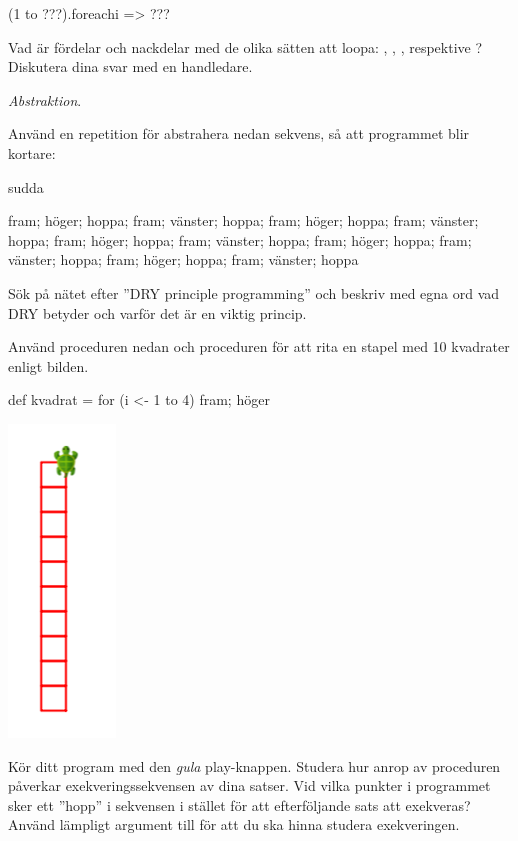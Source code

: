 \begin{Code}
(1 to ???).foreach{i => ???}
\end{Code} 


\Subtask\Checkpoint Vad är fördelar och nackdelar med de olika sätten att loopa: , , , respektive ? \Pen Diskutera dina svar med en handledare.

\Task \textit{Abstraktion}. 

\Subtask Använd en repetition för abstrahera nedan sekvens, så att programmet blir kortare:
\begin{Code}
sudda

fram; höger; hoppa; fram; vänster; hoppa; fram; höger; 
hoppa; fram; vänster; hoppa; fram; höger; hoppa; fram; 
vänster; hoppa; fram; höger; hoppa; fram; vänster; hoppa;
fram; höger; hoppa; fram; vänster; hoppa 
\end{Code}

\Subtask\Pen Sök på nätet efter ''DRY principle programming'' och beskriv med egna ord vad DRY betyder och varför det är en viktig princip.

\Subtask Använd proceduren  nedan och proceduren  för att rita en stapel med 10 kvadrater enligt bilden.

\begin{Code}
def kvadrat = for (i <- 1 to 4) {fram; höger}
\end{Code}

\includegraphics[scale=0.5]{../img/kojo/square-column}

\Subtask Kör ditt program med den \emph{gula} play-knappen. Studera hur anrop av proceduren  påverkar exekveringssekvensen av dina satser. Vid vilka punkter i programmet sker ett ''hopp'' i sekvensen i stället för att efterföljande sats att exekveras? Använd lämpligt argument till  för att du ska hinna studera exekveringen.

